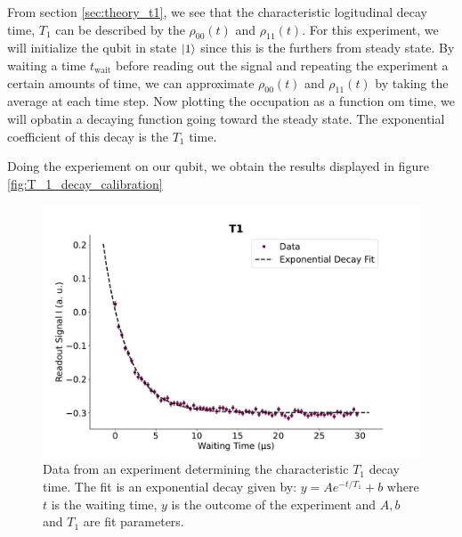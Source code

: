 From section \ref{sec:theory_t1}, we see that the characteristic logitudinal decay time, $T_1$ can be described by the $\rho_{00}(t)$ and $\rho_{11}(t)$. For this experiment, we will initialize the qubit in state $\ket{1}$ since this is the furthers from steady state. By waiting a time $t_{\text{wait}}$ before reading out the signal and repeating the experiment a certain amounts of time, we can approximate  $\rho_{00}(t)$ and $\rho_{11}(t)$ by taking the average at each time step. Now plotting the occupation as a function om time, we will opbatin a decaying function going toward the steady state. The exponential coefficient of this decay is the $T_1$ time. 


Doing the experiement on our qubit, we obtain the results displayed in figure \ref{fig:T_1_decay_calibration}

\begin{figure}
    \centering
    \includegraphics[]{Calibrations/Figures/T1.pdf}
    \caption{Data from an experiment determining the characteristic $T_1$ decay time. The fit is an exponential decay given by: $y = A e^{-t / T_1} + b$ where $t$ is the waiting time, $y$ is the outcome of the experiment and $A, b$ and $T_1$ are fit parameters.}
    \label{fig:calibration_T_1_decay}
\end{figure}

